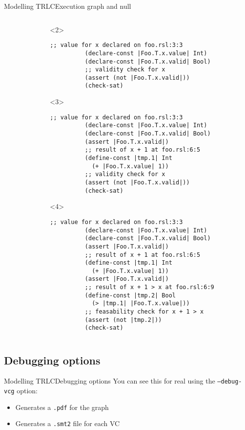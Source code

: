 \documentclass[aspectratio=169]{beamer}
\begin{document}
\begin{frame}[fragile]{Modelling TRLC}{Execution graph and null}
\begin{columns}
\begin{column}{0.5\textwidth}
\begin{center}
      \end{center}
    \end{column}
    \begin{column}{0.5\textwidth}
      \begin{onlyenv}<2>
        \begin{lstlisting}[language=SMTLIB,gobble=10]
          ;; value for x declared on foo.rsl:3:3
          (declare-const |Foo.T.x.value| Int)
          (declare-const |Foo.T.x.valid| Bool)
          ;; validity check for x
          (assert (not |Foo.T.x.valid|))
          (check-sat)
        \end{lstlisting}
      \end{onlyenv}
      \begin{onlyenv}<3>
        \begin{lstlisting}[language=SMTLIB,gobble=10]
          ;; value for x declared on foo.rsl:3:3
          (declare-const |Foo.T.x.value| Int)
          (declare-const |Foo.T.x.valid| Bool)
          (assert |Foo.T.x.valid|)
          ;; result of x + 1 at foo.rsl:6:5
          (define-const |tmp.1| Int
            (+ |Foo.T.x.value| 1))
          ;; validity check for x
          (assert (not |Foo.T.x.valid|))
          (check-sat)
        \end{lstlisting}
      \end{onlyenv}
      \begin{onlyenv}<4>
        \begin{lstlisting}[language=SMTLIB,gobble=8]
          ;; value for x declared on foo.rsl:3:3
          (declare-const |Foo.T.x.value| Int)
          (declare-const |Foo.T.x.valid| Bool)
          (assert |Foo.T.x.valid|)
          ;; result of x + 1 at foo.rsl:6:5
          (define-const |tmp.1| Int
            (+ |Foo.T.x.value| 1))
          (assert |Foo.T.x.valid|)
          ;; result of x + 1 > x at foo.rsl:6:9
          (define-const |tmp.2| Bool
            (> |tmp.1| |Foo.T.x.value|))
          ;; feasability check for x + 1 > x
          (assert (not |tmp.2|))
          (check-sat)
        \end{lstlisting}
      \end{onlyenv}
    \end{column}
  \end{columns}
\end{frame}

\subsection{Debugging options}
\begin{frame}{Modelling TRLC}{Debugging options}
  You can see this for real using the {\tt --debug-vcg} option:
  \begin{itemize}
  \item Generates a {\tt .pdf} for the graph
  \item Generates a {\tt .smt2} file for each VC
  \end{itemize}
\end{frame}
\end{document}
